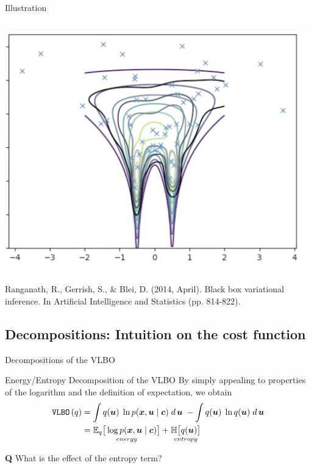 \documentclass[10pt]{beamer}
\begin{document}
\begin{frame}{Illustration}
\begin{minipage}[t][.9\textheight]{\textwidth}
\begin{columns}[t]
\includegraphics[width=.7\textwidth]{images/intro_animation_4.png}
\end{columns}

\vfill

\tiny Ranganath, R., Gerrish, S., \& Blei, D. (2014, April). Black box variational inference. In Artificial Intelligence and Statistics (pp. 814-822).
  \end{minipage}
  
\end{frame}


\subsection{Decompositions: Intuition on the cost function}
\begin{frame}{Decompositions of the VLBO}
\begin{block}{Energy/Entropy Decomposition of the VLBO}
By simply appealing to properties of the logarithm and the definition of expectation, we obtain 
\begin{align*}
\,\texttt{VLBO}\,(q) & = \displaystyle\int  q({\boldsymbol u}) \; \ln p({\boldsymbol x},{\boldsymbol u}  \; | \; {\boldsymbol c}) \; d \,{{\boldsymbol u}} \;   - \displaystyle\int  q({\boldsymbol u}) \; \ln q({\boldsymbol u}) \; d \,{{\boldsymbol u}} \;  \\
& =  \underset{energy}{ \mathbb{E}_q \big[ \log p({\boldsymbol x}, {\boldsymbol u}  \; | \; {\boldsymbol c} ) \big] } + \underset{entropy}{ \mathbb{H} \big[q({\boldsymbol u}) \big] }  
\end{align*}

\end{block} 
\vfill \tiny \textbf{Q}  What is the effect of the entropy term?
\end{frame}
\end{document}
